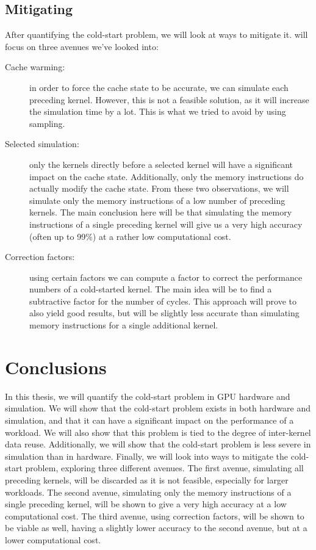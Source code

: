 \subsection{Mitigating}\label{subsec:mitigating}
After quantifying the cold-start problem, we will look at ways to mitigate it.
 will focus on three avenues we've looked into:
\begin{description}
    \item[Cache warming:] in order to force the cache state to be accurate, we can simulate each preceding kernel.
    However, this is not a feasible solution, as it will increase the simulation time by a lot.
    This is what we tried to avoid by using sampling.
    \item[Selected simulation:] only the kernels directly before a selected kernel will have a significant impact on the cache state.
    Additionally, only the memory instructions do actually modify the cache state.
    From these two observations, we will simulate only the memory instructions of a low number of preceding kernels.
    The main conclusion here will be that simulating the memory instructions of a single preceding kernel will give us a very high accuracy (often up to 99\%) at a rather low computational cost.
    \item[Correction factors:] using certain factors we can compute a factor to correct the performance numbers of a cold-started kernel.
    The main idea will be to find a subtractive factor for the number of cycles.
    This approach will prove to also yield good results, but will be slightly less accurate than simulating memory instructions for a single additional kernel.
\end{description}

\section{Conclusions}\label{sec:conclusions}
In this thesis, we will quantify the cold-start problem in GPU hardware and simulation.
We will show that the cold-start problem exists in both hardware and simulation, and that it can have a significant impact on the performance of a workload.
We will also show that this problem is tied to the degree of inter-kernel data reuse.
Additionally, we will show that the cold-start problem is less severe in simulation than in hardware.
Finally, we will look into ways to mitigate the cold-start problem, exploring three different avenues.
The first avenue, simulating all preceding kernels, will be discarded as it is not feasible, especially for larger workloads.
The second avenue, simulating only the memory instructions of a single preceding kernel, will be shown to give a very high accuracy at a low computational cost.
The third avenue, using correction factors, will be shown to be viable as well, having a slightly lower accuracy to the second avenue, but at a lower computational cost.